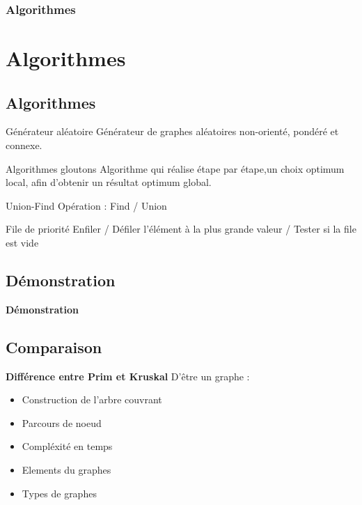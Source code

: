 \documentclass[10pt]{beamer}
\begin{document}
\begin{frame}
\frametitle{Algorithmes}
\section{Algorithmes}
\subsection{Algorithmes}

\begin{block}{Générateur aléatoire}
  Générateur de graphes aléatoires non-orienté, pondéré et connexe.
\end{block}

\begin{alertblock}{Algorithmes gloutons}
Algorithme qui réalise étape par étape,un choix optimum local, afin d'obtenir un résultat optimum global. 
\end{alertblock}

\begin{block}{Union-Find}
  Opération : Find / Union
\end{block}

\begin{block}{File de priorité}
  Enfiler / Défiler l'élément à la plus grande valeur / Tester si la file est vide
\end{block}


\end{frame}

\begin{frame}
\section{Démonstration}
\textbf{Démonstration}

\end{frame}

\begin{frame}
\section{Comparaison}
\textbf{Différence entre Prim et Kruskal}
D'être un graphe :
  \begin{itemize}
     \item<1-> Construction de l'arbre couvrant
     \item<2-> Parcours de noeud
     \item<3-> Compléxité en temps
     \item<4-> Elements du graphes
     \item<5-> Types de graphes
  \end{itemize}
\end{frame}
\end{document}

